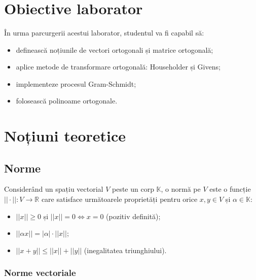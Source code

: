 \documentclass{exam}
\title{
\textmd{\textbf{\MNLabTitle}}
\author{}
\date{}
}
\begin{document}
\begin{coverpages}
	\maketitle
	\thispagestyle{empty}
	\tableofcontents
\end{coverpages}

\section{Obiective laborator}

În urma parcurgerii acestui laborator, studentul va fi capabil să:
\begin{itemize}
	\item definească noțiunile de vectori ortogonali și matrice ortogonală;
	\item aplice metode de transformare ortogonală: Householder și Givens;
	\item implementeze procesul Gram-Schmidt;
	\item folosească polinoame ortogonale.
\end{itemize}

\section{Noțiuni teoretice}

\subsection{Norme}

Considerând un spațiu vectorial $V$ peste un corp $\mathbb{K}$, o normă pe
$V$ este o funcție $||\cdot||: V \rightarrow \mathbb{R}$ care satisface
următoarele proprietăți pentru orice $x, y \in V$ și $\alpha \in \mathbb{K}$:
\begin{itemize}
	\item $||x|| \geq 0$ și $||x|| = 0 \Leftrightarrow x = 0$ (pozitiv definită);
	\item $||\alpha x|| = |\alpha| \cdot ||x||$;
	\item $||x + y|| \leq ||x|| + ||y||$ (inegalitatea triunghiului).
\end{itemize}

\subsubsection{Norme vectoriale}
\end{document}
